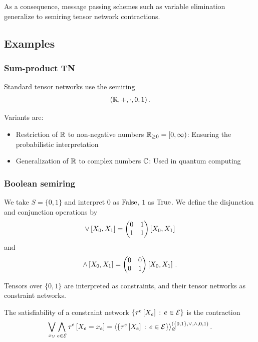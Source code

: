 As a consequence, message passing schemes such as variable elimination generalize to semiring tensor network contractions.

\subsection{Examples}

\subsubsection{Sum-product TN}\label{sec:complexSPContraction}

Standard tensor networks use the semiring
\begin{align*}
    (\mathbb{R},+,\cdot,0,1)
    \, .
\end{align*}


Variants are:
\begin{itemize}
    \item Restriction of $\mathbb{R}$ to non-negative numbers $\mathbb{R}_{\geq 0}= [0,\infty)$: Ensuring the probabilistic interpretation
    \item Generalization of $\mathbb{R}$ to complex numbers $\mathbb{C}$: Used in quantum computing
\end{itemize}

\subsubsection{Boolean semiring}

We take $S=\{0,1\}$ and interpret $0$ as $\mathrm{False}$, $1$ as $\mathrm{True}$.
We define the disjunction and conjunction operations by
\begin{align*}
    \lor \left[X_{0},X_{1}\right]
    = \begin{pmatrix} 0 & 1 \\ 1 & 1 \end{pmatrix}\left[X_{0},X_{1}\right]
\end{align*}
and
\begin{align*}
    \land \left[X_{0},X_{1}\right]
    = \begin{pmatrix} 0 & 0 \\ 0 & 1 \end{pmatrix}\left[X_{0},X_{1}\right] \, .
\end{align*}

Tensors over $\{0,1\}$ are interpreted as constraints, and their tensor networks as constraint networks.

The satisfiability of a constraint network $\left\{\tau^{e}\left[X_{e}\right]\,:\,e\in\mathcal{E}\right\}$ is the contraction
\begin{align*}
    \bigvee_{x_{\mathcal{V}}} \bigwedge_{e\in\mathcal{E}} \tau^{e}\left[X_{e}=x_{e}\right]
    = \langle
        \left\{\tau^{e}\left[X_{e}\right]\,:\,e\in\mathcal{E}\right\}
    \rangle^{(\{0,1\},\lor,\land,0,1)}_{\varnothing} \, .
\end{align*}

